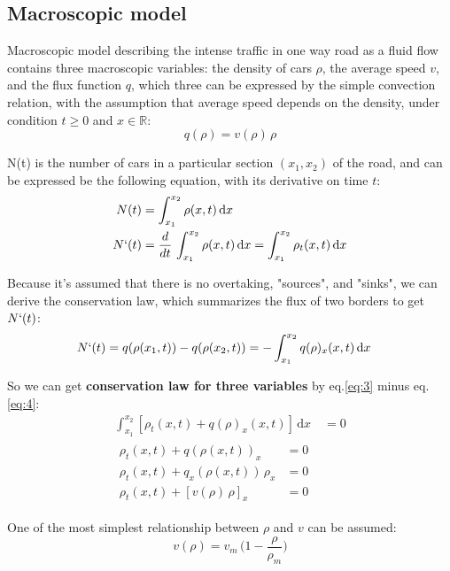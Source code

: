 \documentclass[../main.tex]{subfiles}
\begin{document}
\subsection{Macroscopic model}

Macroscopic model describing the intense traffic in one way road as a fluid flow contains three macroscopic variables: the density of cars $\rho$, the average speed $v$, and the flux function $q$, which three can be expressed by the simple convection relation, with the assumption that average speed depends on the density, under condition $t \geqslant 0$ and $x \in \mathbb{R}$:
\begin{equation} \label{eq:1}
    q(\rho) = v(\rho) \, \rho
\end{equation}

N(t) is the number of cars in a particular section $(x_1,x_2)$ of the road, and can be expressed be the following equation, with its derivative on time $t$:
\begin{align} 
    N(t) &= \int_{x_1}^{x_2} \rho(x,t) \, \mathrm{d}x \label{eq:2} \\
    N`(t) &= \frac{d}{dt} \, \int_{x_1}^{x_2} \rho(x,t) \, \mathrm{d}x = \int_{x_1}^{x_2} \rho_t(x,t) \,\mathrm{d}x \label{eq:3}
\end{align}

Because it's assumed that there is no overtaking, "sources", and "sinks", we can derive the conservation law, which summarizes the flux of two borders to get $N`(t)$:
\begin{align}
        N`(t) &= q(\rho(x_1,t)) - q(\rho(x_2,t)) = - \int_{x_1}^{x_2} q(\rho)_x(x,t) \, \mathrm{d}x \label{eq:4}
\end{align}

So we can get \textbf{conservation law for three variables} by eq.\ref{eq:3} minus eq.\ref{eq:4}:
\begin{align}
    \int_{x_1}^{x_2} [\rho_t(x,t) + q(\rho)_x(x,t)] \, \mathrm{d}x &= 0  \label{eq:5} \\
    \begin{split} \label{eq:6}
        \rho_t(x,t) + q(\rho(x,t))_x &= 0 \\
        \rho_t(x,t) + q_x(\rho(x,t)) \, \rho_x &= 0 \\
        \rho_t(x,t) + [v(\rho) \, \rho]_x & =0
    \end{split}
\end{align}

One of the most simplest relationship between $\rho$ and $v$ can be assumed:
\begin{equation}
   v(\rho) = v_m \, \bigg(1 - \frac{\rho}{\rho_m}\bigg) \label{eq:7}
\end{equation}
\end{document}
